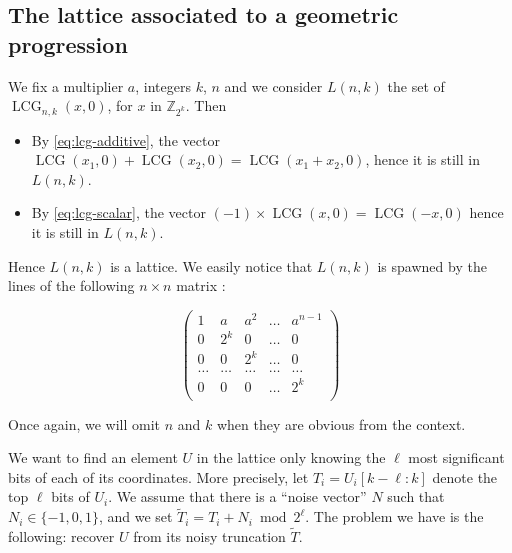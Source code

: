 \documentclass[preprint,svgnames]{iacrtrans}
\DeclareMathOperator{\LCG}{LCG}
\begin{document}
\subsection{The lattice associated to a geometric progression}\label{lattice}

We fix a multiplier \(a\), integers \(k\), \(n\) and we consider \(L(n,k)\) the set of \(\LCG_{n,k}(x, 0)\), for \(x\) in \(\mathbb{Z}_{2^k}\). Then

\begin{itemize}
	\item By \eqref{eq:lcg-additive}, the vector \(\LCG(x_1,0) + \LCG(x_2,0) = \LCG(x_1+x_2,0)\), hence it is still in \(L(n,k)\).
	\item By \eqref{eq:lcg-scalar}, the vector \((-1)\times \LCG(x,0) = \LCG(-x,0)\) hence it is still in \(L(n,k)\).
\end{itemize}

Hence \(L(n,k)\) is a lattice. We easily notice that \(L(n,k)\) is spawned by the lines of the following \(n\times n\) matrix :

\[
  \begin{pmatrix}
    1 & a   & a^2 & \dots & a^{n-1} \\
    0 & 2^k & 0   & \dots & 0 \\
    0 & 0   & 2^k & \dots & 0 \\
    \dots & \dots & \dots & \dots & \dots\\
    0 & 0 & 0 & \dots & 2^k \\
  \end{pmatrix}
\]

Once again, we will omit $n$ and $k$ when they are obvious from the context.

We want to find an element \(U\) in the lattice only knowing the $\ell$ most significant bits of each of its coordinates.  More precisely, let $T_i = U_i[k-\ell:k]$ denote the top $\ell$ bits of $U_i$. We assume that there is a ``noise vector'' $N$ such that $N_i \in \{-1, 0, 1\}$, and we set $\widetilde{T}_i = T_i + N_i \bmod 2^{\ell}$. The problem we have is the  following: recover $U$ from its noisy truncation $\widetilde{T}$.
\end{document}
